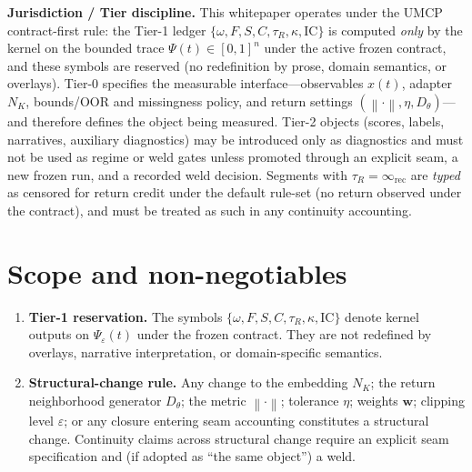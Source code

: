 \documentclass[
  aps,
  prd,
  preprint,
  superscriptaddress,
  nofootinbib,
  floatfix
]{revtex4-2}
\newcommand{\Rinf}{\infty_{\mathrm{rec}}}
\newcommand{\IC}{\mathrm{IC}}
\newcommand{\norm}[1]{\left\lVert #1 \right\rVert}
\begin{document}
\maketitle
\noindent\textbf{Jurisdiction / Tier discipline.}
This whitepaper operates under the UMCP contract-first rule: the Tier-1 ledger
$\{\omega, F, S, C, \tau_R, \kappa, \IC\}$ is computed \emph{only} by the kernel on the bounded trace
$\Psi(t)\in[0,1]^n$ under the active frozen contract, and these symbols are reserved (no redefinition
by prose, domain semantics, or overlays).
Tier-0 specifies the measurable interface---observables $x(t)$, adapter $N_K$, bounds/OOR and missingness policy,
and return settings $(\norm{\cdot},\eta,D_\theta)$---and therefore defines the object being measured.
Tier-2 objects (scores, labels, narratives, auxiliary diagnostics) may be introduced only as diagnostics and must not be used as
regime or weld gates unless promoted through an explicit seam, a new frozen run, and a recorded weld decision.
Segments with $\tau_R=\Rinf$ are \emph{typed} as censored for return credit under the default rule-set (no return observed under the contract),
and must be treated as such in any continuity accounting.
\par\vspace{0.75em}

\section*{Scope and non-negotiables}
\begin{enumerate}[leftmargin=2.1em]
  \item \textbf{Tier-1 reservation.}
  The symbols $\{\omega, F, S, C, \tau_R, \kappa, \IC\}$ denote kernel outputs on $\Psi_\varepsilon(t)$ under the frozen contract.
  They are not redefined by overlays, narrative interpretation, or domain-specific semantics.

  \item \textbf{Structural-change rule.}
  Any change to the embedding $N_K$; the return neighborhood generator $D_\theta$; the metric $\norm{\cdot}$; tolerance $\eta$;
  weights $\bm{w}$; clipping level $\varepsilon$; or any closure entering seam accounting constitutes a structural change.
  Continuity claims across structural change require an explicit seam specification and (if adopted as ``the same object'') a weld.
\end{enumerate}
\end{document}
